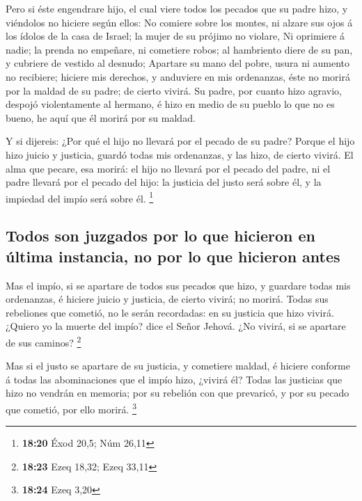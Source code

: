  Pero si éste engendrare hijo, el cual viere todos los
pecados que su padre hizo, y viéndolos no hiciere según ellos:
 No comiere sobre los montes, ni alzare sus ojos á los
ídolos de la casa de Israel; la mujer de su prójimo no violare,
 Ni oprimiere á nadie; la prenda no empeñare, ni
cometiere robos; al hambriento diere de su pan, y cubriere de vestido al
desnudo;  Apartare su mano del pobre, usura ni aumento no
recibiere; hiciere mis derechos, y anduviere en mis ordenanzas, éste no
morirá por la maldad de su padre; de cierto vivirá.  Su
padre, por cuanto hizo agravio, despojó violentamente al hermano, é hizo
en medio de su pueblo lo que no es bueno, he aquí que él morirá por su
maldad.

 Y si dijereis: ¿Por qué el hijo no llevará por el pecado
de su padre? Porque el hijo hizo juicio y justicia, guardó todas mis
ordenanzas, y las hizo, de cierto vivirá.  El alma que
pecare, esa morirá: el hijo no llevará por el pecado del padre, ni el
padre llevará por el pecado del hijo: la justicia del justo será sobre
él, y la impiedad del impío será sobre él. \footnote{\textbf{18:20} Éxod
  20,5; Núm 26,11}

\hypertarget{todos-son-juzgados-por-lo-que-hicieron-en-uxfaltima-instancia-no-por-lo-que-hicieron-antes}{%
\subsection{Todos son juzgados por lo que hicieron en última instancia,
no por lo que hicieron
antes}\label{todos-son-juzgados-por-lo-que-hicieron-en-uxfaltima-instancia-no-por-lo-que-hicieron-antes}}

 Mas el impío, si se apartare de todos sus pecados que
hizo, y guardare todas mis ordenanzas, é hiciere juicio y justicia, de
cierto vivirá; no morirá.  Todas sus rebeliones que
cometió, no le serán recordadas: en su justicia que hizo vivirá.
 ¿Quiero yo la muerte del impío? dice el Señor Jehová.
¿No vivirá, si se apartare de sus caminos? \footnote{\textbf{18:23} Ezeq
  18,32; Ezeq 33,11}

 Mas si el justo se apartare de su justicia, y cometiere
maldad, é hiciere conforme á todas las abominaciones que el impío hizo,
¿vivirá él? Todas las justicias que hizo no vendrán en memoria; por su
rebelión con que prevaricó, y por su pecado que cometió, por ello
morirá. \footnote{\textbf{18:24} Ezeq 3,20}

